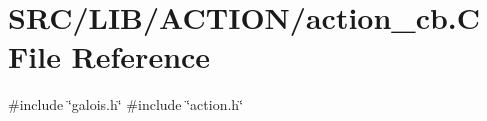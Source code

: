 \hypertarget{action__cb_8_c}{}\section{S\+R\+C/\+L\+I\+B/\+A\+C\+T\+I\+O\+N/action\+\_\+cb.C File Reference}
\label{action__cb_8_c}
{\ttfamily \#include \char`\"{}galois.\+h\char`\"{}}\newline
{\ttfamily \#include \char`\"{}action.\+h\char`\"{}}\newline
